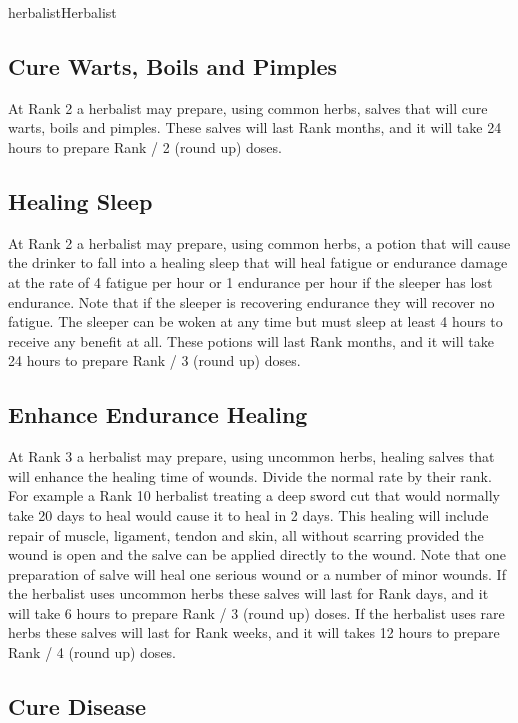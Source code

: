 \begin{Skill}[1.1]{herbalist}{Herbalist}
\subsection{Cure Warts, Boils and Pimples}

At Rank 2 a herbalist may prepare, using common herbs, salves that
will cure warts, boils and pimples.  These salves will last Rank
months, and it will take 24 hours to prepare Rank / 2 (round up)
doses.

\subsection{Healing Sleep}

At Rank 2 a herbalist may prepare, using common herbs, a potion that
will cause the drinker to fall into a healing sleep that will heal
fatigue or endurance damage at the rate of 4 fatigue per hour or 1
endurance per hour if the sleeper has lost endurance.  Note that if
the sleeper is recovering endurance they will recover no fatigue.  The
sleeper can be woken at any time but must sleep at least 4 hours to
receive any benefit at all.  These potions will last Rank months, and
it will take 24 hours to prepare Rank / 3 (round up) doses.

\subsection{Enhance Endurance Healing}

At Rank 3 a herbalist may prepare, using uncommon herbs, healing
salves that will enhance the healing time of wounds. Divide the normal
rate by their rank.  For example a Rank 10 herbalist treating a deep
sword cut that would normally take 20 days to heal would cause it to
heal in 2 days.  This healing will include repair of muscle, ligament,
tendon and skin, all without scarring provided the wound is open and
the salve can be applied directly to the wound. Note that one
preparation of salve will heal one serious wound or a number of minor
wounds.  If the herbalist uses uncommon herbs these salves will last
for Rank days, and it will take 6 hours to prepare Rank / 3 (round up)
doses.  If the herbalist uses rare herbs these salves will last for
Rank weeks, and it will takes 12 hours to prepare Rank / 4 (round up)
doses.

\subsection{Cure Disease}


\end{Skill}
